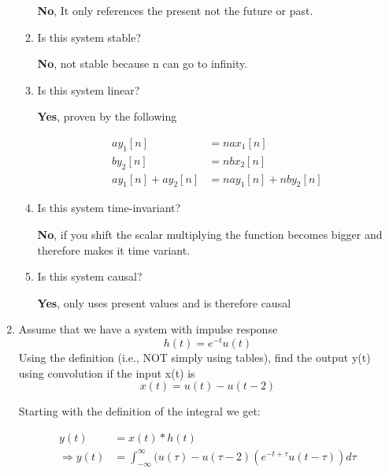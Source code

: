 \documentclass{article}
\begin{document}
\begin{enumerate}
\begin{enumerate}
\begin{center}
            \textbf{No}, It only references the present not the future or past.
        \end{center}
        \item Is this system stable?
        \begin{center}
            \textbf{No}, not stable because n can go to infinity.
        \end{center}
        \item Is this system linear?
        \begin{center}
            \textbf{Yes}, proven by the following
        \end{center}
        \begin{align}
            ay_1[n] &= nax_1[n]\\
            by_2[n] &= nbx_2[n]\\
            ay_1[n] + ay_2[n] &= nay_1[n] + nby_2[n]
        \end{align}
        \item Is this system time-invariant?
        \begin{center}
            \textbf{No}, if you shift the scalar multiplying the function becomes bigger and therefore makes it time variant.
        \end{center}
        \item Is this system causal?
        \begin{center}
            \textbf{Yes}, only uses present values and is therefore causal
        \end{center}
    \end{enumerate}
    \newpage
    \item Assume that we have a system with impulse response
    \begin{equation}
        h(t) = e^{-t}u(t)
    \end{equation}
    Using the definition (i.e., NOT simply using tables), find the output y(t) using convolution if the input x(t) is
    \begin{equation}
        x(t) = u(t) - u(t-2)
    \end{equation}
    \begin{center}
        Starting with the definition of the integral we get:
    \end{center}
    \begin{align}
        y(t) &= x(t) * h(t)\\
        \Rightarrow y(t) &= \int_{-\infty}^{\infty} (u(\tau)-u(\tau-2)(e^{-t+\tau}u(t - \tau)) d\tau\\

\end{align}
\end{enumerate}
\end{document}
